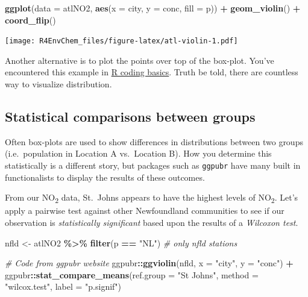 \documentclass[
]{book}
\newenvironment{Shaded}{\begin{snugshade}}{\end{snugshade}}
\newcommand{\AttributeTok}[1]{\textcolor[rgb]{0.13,0.29,0.53}{#1}}
\newcommand{\CommentTok}[1]{\textcolor[rgb]{0.56,0.35,0.01}{\textit{#1}}}
\newcommand{\FunctionTok}[1]{\textcolor[rgb]{0.13,0.29,0.53}{\textbf{#1}}}
\newcommand{\NormalTok}[1]{#1}
\newcommand{\OtherTok}[1]{\textcolor[rgb]{0.56,0.35,0.01}{#1}}
\newcommand{\SpecialCharTok}[1]{\textcolor[rgb]{0.81,0.36,0.00}{\textbf{#1}}}
\newcommand{\StringTok}[1]{\textcolor[rgb]{0.31,0.60,0.02}{#1}}
\begin{document}
\begin{Shaded}
\begin{Highlighting}[]
\FunctionTok{ggplot}\NormalTok{(}\AttributeTok{data =}\NormalTok{ atlNO2, }
       \FunctionTok{aes}\NormalTok{(}\AttributeTok{x =}\NormalTok{ city, }\AttributeTok{y =}\NormalTok{ conc, }\AttributeTok{fill =}\NormalTok{ p)) }\SpecialCharTok{+} 
  \FunctionTok{geom\_violin}\NormalTok{() }\SpecialCharTok{+}
  \FunctionTok{coord\_flip}\NormalTok{()}
\end{Highlighting}
\end{Shaded}

\texttt{[image: R4EnvChem\_files/figure-latex/atl-violin-1.pdf]}

Another alternative is to plot the points over top of the box-plot. You've encountered this example in \protect\hyperlink{r-coding-basics}{R coding basics}. Truth be told, there are countless way to visualize distribution.

\hypertarget{statistical-comparisons-between-groups}{%
\subsection{Statistical comparisons between groups}\label{statistical-comparisons-between-groups}}

Often box-plots are used to show differences in distributions between two groups (i.e.~population in Location A vs.~Location B). How you determine this statistically is a different story, but packages such as \texttt{ggpubr} have many built in functionalists to display the results of these outcomes.

From our NO\textsubscript{2} data, St.~Johns appears to have the highest levels of NO\textsubscript{2}. Let's apply a pairwise test against other Newfoundland communities to see if our observation is \emph{statistically significant} based upon the results of a \emph{Wilcoxon test}.

\begin{Shaded}
\begin{Highlighting}[]
\NormalTok{nfld }\OtherTok{\textless{}{-}}\NormalTok{ atlNO2 }\SpecialCharTok{\%\textgreater{}\%}
  \FunctionTok{filter}\NormalTok{(p }\SpecialCharTok{==} \StringTok{"NL"}\NormalTok{) }\CommentTok{\# only nfld stations}

\CommentTok{\# Code from ggpubr website}
\NormalTok{ggpubr}\SpecialCharTok{::}\FunctionTok{ggviolin}\NormalTok{(nfld, }\AttributeTok{x =} \StringTok{"city"}\NormalTok{, }\AttributeTok{y =} \StringTok{"conc"}\NormalTok{) }\SpecialCharTok{+}
\NormalTok{  ggpubr}\SpecialCharTok{::}\FunctionTok{stat\_compare\_means}\NormalTok{(}\AttributeTok{ref.group =} \StringTok{"St Johns"}\NormalTok{,}
                             \AttributeTok{method =} \StringTok{"wilcox.test"}\NormalTok{,}
                             \AttributeTok{label =} \StringTok{"p.signif"}\NormalTok{) }
\end{Highlighting}
\end{Shaded}
\end{document}
